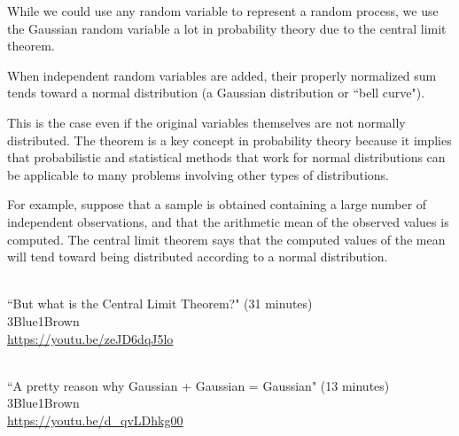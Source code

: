 While we could use any random variable to represent a random process, we use the
Gaussian random variable a lot in probability theory due to the central limit
theorem.
\begin{definition}
  When independent random variables are added, their properly normalized sum
  tends toward a normal distribution (a Gaussian distribution or ``bell curve").
\end{definition}

This is the case even if the original variables themselves are not normally
distributed. The theorem is a key concept in probability theory because it
implies that probabilistic and statistical methods that work for normal
distributions can be applicable to many problems involving other types of
distributions.

For example, suppose that a sample is obtained containing a large number of
independent observations, and that the arithmetic mean of the observed values
is computed. The central limit theorem says that the computed values of the
mean will tend toward being distributed according to a normal distribution.
\begin{bookfigure}
  \begin{bookminifig}{2}
     \\
    ``But what is the Central Limit Theorem?" (31 minutes) \\
    \footnotesize 3Blue1Brown \\
    \url{https://youtu.be/zeJD6dqJ5lo}
  \end{bookminifig}
  \begin{bookminifig}{2}
     \\
    ``A pretty reason why Gaussian + Gaussian = Gaussian" (13 minutes) \\
    \footnotesize 3Blue1Brown \\
    \url{https://youtu.be/d_qvLDhkg00}
  \end{bookminifig}
\end{bookfigure}
